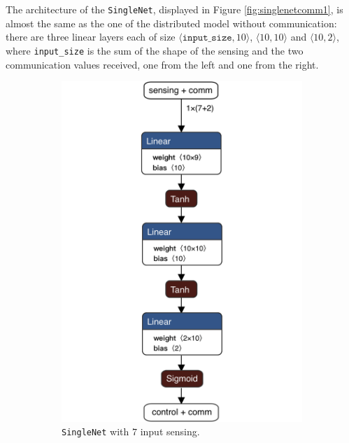 The architecture of the \texttt{SingleNet}, displayed in Figure 
\ref{fig:singlenetcomm1}, is almost the same as the one of the distributed 
model without communication: there are three linear layers each of size 
$\langle\mathtt{input\_size}, 10\rangle$,  $\langle 10, 10\rangle$ and $\langle 
10, 2\rangle$, where \texttt{input\_size} is the sum of the shape of the sensing 
and the two communication values received, one from the left and one from the 
right.

\begin{figure}[!htb]
	\centering
	\begin{subfigure}[h]{0.495\textwidth}
		\centering
		\includegraphics[width=.8\textwidth]{contents/images/task1distributedcomm@4x}%
		\caption{\texttt{SingleNet} with $7$ input sensing.}
	\end{subfigure}
	\hfill
	\begin{subfigure}[h]{0.495\textwidth}
		\centering

\end{subfigure}
\end{figure}
